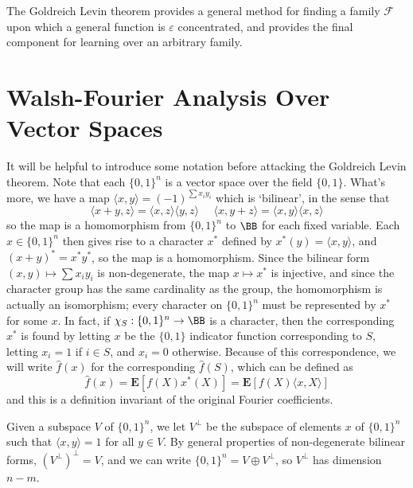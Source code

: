 The Goldreich Levin theorem provides a general method for finding a family $\mathcal{F}$ upon which a general function is $\varepsilon$ concentrated, and provides the final component for learning over an arbitrary family.

\section{Walsh-Fourier Analysis Over Vector Spaces}

It will be helpful to introduce some notation before attacking the Goldreich Levin theorem. Note that each $\{ 0, 1 \}^n$ is a vector space over the field $\{ 0, 1 \}$. What's more, we have a map $\langle x, y \rangle = (-1)^{\sum x_i y_i}$ which is `bilinear', in the sense that
%
\[ \langle x + y, z \rangle = \langle x,z \rangle \langle y, z \rangle\ \ \ \ \ \ \langle x, y + z \rangle = \langle x, y \rangle \langle x, z \rangle \]
%
so the map is a homomorphism from $\{ 0, 1 \}^n$ to $\BB$ for each fixed variable. Each $x \in \{ 0, 1 \}^n$ then gives rise to a character $x^*$ defined by $x^*(y) = \langle x, y \rangle$, and $(x + y)^* = x^* y^*$, so the map is a homomorphism. Since the bilinear form $(x,y) \mapsto \sum x_i y_i$ is non-degenerate, the map $x \mapsto x^*$ is injective, and since the character group has the same cardinality as the group, the homomorphism is actually an isomorphism; every character on $\{ 0, 1 \}^n$ must be represented by $x^*$ for some $x$. In fact, if $\chi_S: \{ 0, 1 \}^n \to \BB$ is a character, then the corresponding $x^*$ is found by letting $x$ be the $\{ 0, 1 \}$ indicator function corresponding to $S$, letting $x_i = 1$ if $i \in S$, and $x_i = 0$ otherwise. Because of this correspondence, we will write $\widehat{f}(x)$ for the corresponding $\widehat{f}(S)$, which can be defined as
%
\[ \widehat{f}(x) = \mathbf{E}[f(X)x^*(X)] = \mathbf{E}[f(X) \langle x, X \rangle] \]
%
and this is a definition invariant of the original Fourier coefficients.

Given a subspace $V$ of $\{ 0, 1 \}^n$, we let $V^\perp$ be the subspace of elements $x$ of $\{ 0, 1 \}^n$ such that $\langle x, y \rangle = 1$ for all $y \in V$. By general properties of non-degenerate bilinear forms, $(V^\perp)^\perp = V$, and we can write $\{ 0, 1 \}^n = V \oplus V^\perp$, so $V^\perp$ has dimension $n - m$.

